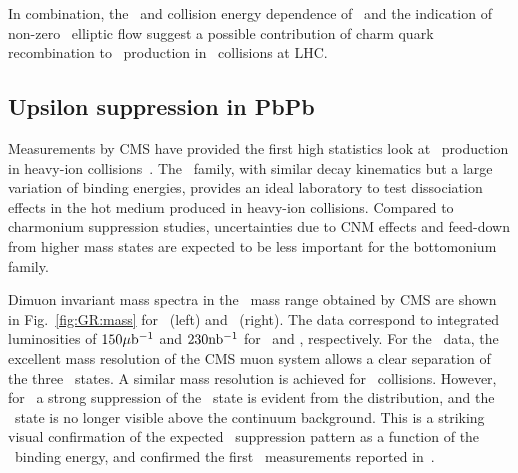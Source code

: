 In combination, the \pT\ and collision energy dependence of \jpsi \Raa\ and the indication of non-zero \jpsi\ elliptic
flow suggest a possible  contribution of charm quark recombination to \jpsi\ production in \PbPb\ collisions
at LHC.

\subsection{Upsilon suppression in PbPb}

Measurements by CMS have provided the first high statistics look at \PgU\ 
production in heavy-ion collisions~\cite{CMS_Y_2010}.
The \PgU\ family, with similar decay kinematics but a large variation of binding energies, 
provides an ideal laboratory to test dissociation effects in the hot medium produced in 
heavy-ion collisions. Compared to charmonium suppression studies, uncertainties due
to CNM effects and feed-down from higher mass states are expected to be 
less important for the bottomonium family.

Dimuon invariant mass spectra in the \PgU\ mass range obtained by CMS are shown in Fig.~\ref{fig:GR:mass} for \PbPb\ (left) 
and \pp\ (right). The data correspond to integrated luminosities of $150\mathrm{\mu b^{-1}}$ and $230 \mathrm{nb^{-1}}$ for 
\PbPb\ and \pp, respectively. For the \pp\ data, the excellent mass resolution of the CMS muon system
allows a clear separation of the three \PgUn\ states. A similar mass resolution is achieved for \PbPb\ collisions. 
However, for \PbPb\ a strong suppression of the \PgUb\ state is evident from the distribution, and the \PgUc\ state 
is no longer visible above the continuum background. This is a striking visual confirmation of the expected
\PgU\ suppression pattern as a function of the \PgUn\ binding energy, and confirmed the first \PgU\ measurements
reported in~\cite{CMS_Y_2010}.

